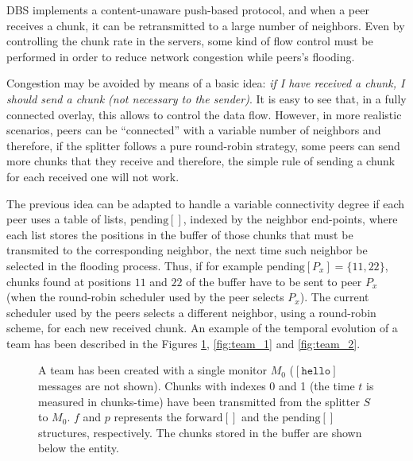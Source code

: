 
\label{sec:chunk_flooding}

\begin{comment}
\begin{figure*}
  \imgw{300}{graphics/peer_chunk_flooding.svg}
  \caption{Chunk flooding at peers.\label{fig:peer_chunk_flooding}}
\end{figure*}
\end{comment}

DBS implements a content-unaware push-based protocol, and when a peer
receives a chunk, it can be retransmitted to a large number of
neighbors. Even by controlling the chunk rate in the servers, some
kind of flow control must be performed in order to reduce network
congestion while peers's flooding.


Congestion may be avoided by means of a basic idea: \textit{if I have
  received a chunk, I should send a chunk (not necessary to the
  sender)}. It is easy to see that, in a fully connected overlay, this
allows to control the data flow. However, in more realistic scenarios,
peers can be ``connected'' with a variable number of neighbors and
therefore, if the splitter follows a pure round-robin strategy, some
peers can send more chunks that they receive and therefore, the simple
rule of sending a chunk for each received one will not work.

The previous idea can be adapted to handle a variable connectivity
degree if each peer uses a table of lists, $\text{pending}[]$, indexed
by the neighbor end-points, where each list stores the positions in
the buffer of those chunks that must be transmited to the
corresponding neighbor, the next time such neighbor be selected in the
flooding process. Thus, if for example
$\text{pending}[P_x]=\{11,22\}$, chunks found at positions $11$ and
$22$ of the buffer have to be sent to peer $P_x$ (when the round-robin
scheduler used by the peer selects $P_x$). The current scheduler used
by the peers selects a different neighbor, using a round-robin scheme,
for each new received chunk. An example of the temporal evolution of a
team has been described in the Figures \ref{fig:team_0},
\ref{fig:team_1} and \ref{fig:team_2}.

\begin{figure}
   \caption{A team has been created with a
    single monitor $M_0$ ($[\mathtt{hello}]$ messages are not
    shown). Chunks with indexes 0 and 1 (the time $t$ is measured in
    chunks-time) have been transmitted from the splitter $S$ to
    $M_0$. $f$ and $p$ represents the $\text{forward}[]$ and the
    $\text{pending}[]$ structures, respectively. The chunks stored in
    the buffer are shown below the entity.\label{fig:team_0}}
\end{figure}


